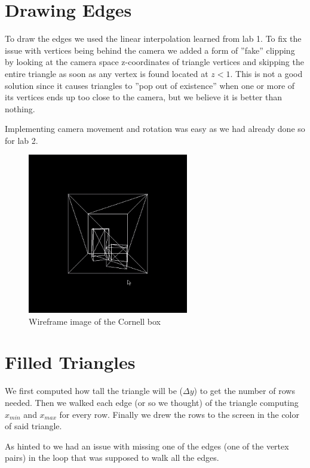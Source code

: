 \documentclass[a4paper,11pt]{article}
\begin{document}
\section*{Drawing Edges}
To draw the edges we used the linear interpolation learned from lab 1.
To fix the issue with vertices being behind the camera we added a form of ''fake'' clipping
by looking at the camera space z-coordinates of triangle vertices and skipping the entire
triangle as soon as any vertex is found located at $z < 1$. This is not a good solution since it
causes triangles to ''pop out of existence'' when one or more of its vertices ends up
too close to the camera, but we believe it is better than nothing.

Implementing camera movement and rotation was easy as we had already done so for lab 2.

\begin{figure}[H]
\begin{center}
\includegraphics[width=7cm]{wire.jpg}
\caption{Wireframe image of the Cornell box}
\end{center}
\end{figure}
\vspace{-0.5cm}

\section*{Filled Triangles}
We first computed how tall the triangle will be ($\Delta y$) to get the number of rows needed. 
Then we walked each edge (or so we thought) of the triangle computing $x_{min}$ and $x_{max}$ for
every row. Finally we drew the rows to the screen in the color of said triangle.

As hinted to we had an issue with missing one of the edges (one of the vertex pairs) in the loop that was
supposed to walk all the edges.
\end{document}
